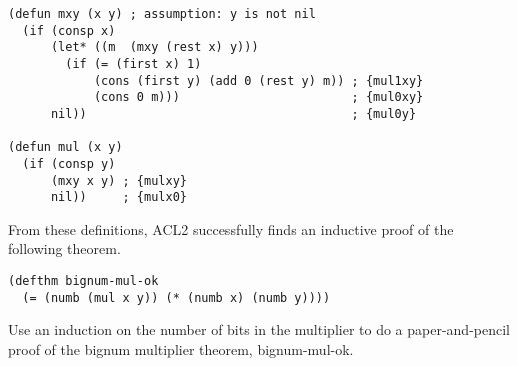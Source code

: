 \label{bignum-mul-defun}
\begin{Verbatim}
(defun mxy (x y) ; assumption: y is not nil
  (if (consp x)
      (let* ((m  (mxy (rest x) y)))
        (if (= (first x) 1)
            (cons (first y) (add 0 (rest y) m)) ; {mul1xy}
            (cons 0 m)))                        ; {mul0xy}
      nil))                                     ; {mul0y}

(defun mul (x y)
  (if (consp y)
      (mxy x y) ; {mulxy}
      nil))     ; {mulx0}
\end{Verbatim}

From these definitions, ACL2 successfully finds an
inductive proof of the following theorem.
\label{bignum-mul-thm}
\begin{Verbatim}
(defthm bignum-mul-ok
  (= (numb (mul x y)) (* (numb x) (numb y))))
\end{Verbatim}

\begin{ExerciseList}
\Exercise
Use an induction on the number of bits in the
multiplier to do a paper-and-pencil proof of
the bignum multiplier theorem, bignum-mul-ok.
\end{ExerciseList}


